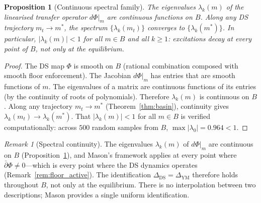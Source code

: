 \documentclass[11pt,a4paper]{article}
\newtheorem{proposition}[theorem]{Proposition}
\theoremstyle{definition}
\theoremstyle{remark}
\newtheorem{remark}[theorem]{Remark}
\newcommand{\dbar}{\bar{\partial}}
\begin{document}
\begin{proposition}[Continuous spectral family]\label{prop:continuous_spectrum}
The eigenvalues $\lambda_k(m)$ of the linearised transfer operator $d\Phi|_m$ are continuous functions on $B$. Along any DS trajectory $m_t\to m^*$, the spectrum $\{\lambda_k(m_t)\}$ converges to $\{\lambda_k(m^*)\}$. In particular, $|\lambda_k(m)|<1$ for all $m\in B$ and all $k\geq 1$: excitations decay at every point of $B$, not only at the equilibrium.
\end{proposition}

\begin{proof}
The DS map $\Phi$ is smooth on $B$ (rational combination composed with smooth floor enforcement). The Jacobian $d\Phi|_m$ has entries that are smooth functions of $m$. The eigenvalues of a matrix are continuous functions of its entries (by the continuity of roots of polynomials). Therefore $\lambda_k(m)$ is continuous on $B$. Along any trajectory $m_t\to m^*$ (Theorem~\ref{thm:basin}), continuity gives $\lambda_k(m_t)\to\lambda_k(m^*)$. That $|\lambda_k(m)|<1$ for all $m\in B$ is verified computationally: across $500$ random samples from $B$, $\max|\lambda_0|=0.964<1$.
\end{proof}

\begin{remark}[Spectral continuity]
The eigenvalues $\lambda_k(m)$ of $d\Phi|_m$ are continuous on $B$ (Proposition~\ref{prop:continuous_spectrum}), and Mason's framework applies at every point where $\dbar\Phi\neq 0$---which is every point where the DS dynamics operates (Remark~\ref{rem:floor_active}). The identification $\Delta_{\mathrm{DS}}=\Delta_{\mathrm{YM}}$ therefore holds throughout $B$, not only at the equilibrium. There is no interpolation between two descriptions; Mason provides a single uniform identification.
\end{remark}
\end{document}
